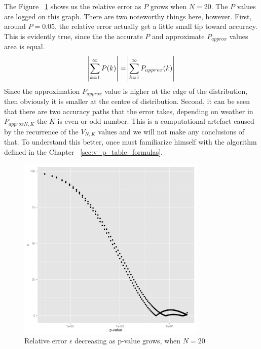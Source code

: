 \documentclass[12pt]{article}
\begin{document}
The Figure ~\ref{fig:RelativeErrorDecresingPgrows} shows us the relative error as $P$ grows when $N = 20$. The $P$ values are logged on this graph. There are two noteworthy things here, however. First, around $P = 0.05$, the relative error actually get a little small tip toward accuracy. This is evidently true, since the the accurate $P$ and approximate $P_{approx}$ values area is equal.
\begin{equation}
  \abs{\sum\limits_{k=1}^{\infty}{P(k)}} = \abs{\sum\limits_{k=1}^{\infty}{P_{approx}(k)}}
\end{equation}
Since the approximation $P_{approx}$ value is higher at the edge of the distribution, then obviously it is smaller at the centre of distribution. Second, it can be seen that there are two accuracy paths that the error takes, depending on weather in $P_{approx N, K}$  the $K$ is even or odd number. This is a computational artefact caused by the recurrence of the $V_{N, K}$ values and we will not make any conclusions of that. To understand this better, once must familiarize himself with the algorithm defined in the Chapter ~\ref{sec:v_p_table_formulas}.


\begin{figure}[H]
	\centering
  \includegraphics[width=0.8\textwidth]{RelativeErrorDecreasingPgrowsN20}
	\caption{Relative error $\epsilon$ decreasing as p-value grows, when $N=20$}
	\label{fig:RelativeErrorDecresingPgrows}
\end{figure}
\end{document}
